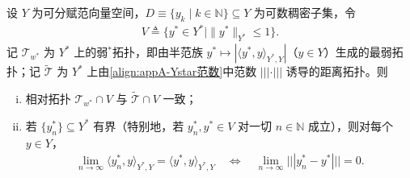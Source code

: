 \documentclass[../main.tex]{subfiles}
\begin{document}
\begin{proposition}\label{proposition:appA-弱星可度量化}\label{proposition:appA-弱星拓扑}
设 $Y$ 为可分赋范向量空间，$D\equiv\{y_k\mid k\in\mathbb{N}\}\subseteq Y$ 为可数稠密子集，令
\begin{align}
V\triangleq\{y^*\in Y^*\mid\|y^*\|_{Y^*}\leqslant1\}. \label{align:appA-V单位球}
\end{align}
记 $\mathscr{T}_{w^*}$ 为 $Y^*$ 上的弱$^*$拓扑，即由半范族 $y^*\mapsto|\langle y^*,y\rangle_{Y^*,Y}|$（$y\in Y$）生成的最弱拓扑；记 $\widetilde{\mathscr{T}}$ 为 $Y^*$ 上由\eqref{align:appA-Ystar范数}中范数 $|||\cdot|||$ 诱导的距离拓扑。则
\begin{enumerate}[(i)]
\item 相对拓扑 $\mathscr{T}_{w^*}\cap V$ 与 $\widetilde{\mathscr{T}}\cap V$ 一致；
\item 若 $\{y_n^*\}\subseteq Y^*$ 有界（特别地，若 $y_n^*,y^*\in V$ 对一切 $n\in\mathbb{N}$ 成立），则对每个 $y\in Y$，
\begin{align*}
\lim_{n\to\infty}\langle y_n^*,y\rangle_{Y^*,Y}=\langle y^*,y\rangle_{Y^*,Y}
\quad\Longleftrightarrow\quad
\lim_{n\to\infty}|||y_n^*-y^*|||=0.
\end{align*}
\end{enumerate}
\end{proposition}
\end{document}
